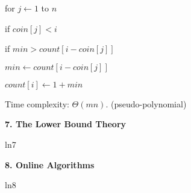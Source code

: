 \documentclass[8pt]{minimal}
\begin{document}
\begin{flushleft}
\begin{multicols}{3}
\qquad\qquad\qquad for $j\leftarrow 1$ to $n$

\qquad\qquad\qquad\qquad if $coin[j]<i$ 
              
\qquad\qquad\qquad\qquad\qquad if $min>count[i-coin[j]]$

\qquad\qquad\qquad\qquad\qquad\qquad $min\leftarrow count[i-coin[j]]$

\qquad\qquad\qquad $count[i]\leftarrow 1+min$
 
Time complexity: $\Theta(mn)$. (pseudo-polynomial)



    \textbf{7. The Lower Bound Theory}

    ln7


    \textbf{8. Online Algorithms}

    ln8
    

    \lipsum
    \lipsum

\end{multicols}
\end{flushleft}
\end{document}
